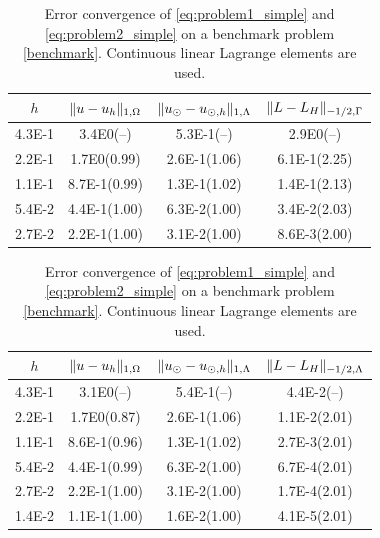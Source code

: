 \documentclass[r]{siamart171218}
\begin{document}
%
\begin{table}
  \scriptsize{
    \begin{minipage}{0.49\textwidth}
  \begin{center}
    \begin{tabular}{c|ccc}
      \hline
    $h$ & $\lVert{u-u_h}\rVert_{1, \Omega}$ & $\lVert{u_{\odot}-u_{\odot, h}}\rVert_{1, \Lambda}$ & $\lVert{L-L_H}\rVert_{-1/2,\Gamma}$\\
      \hline
4.3E-1 & 3.4E0(--) & 5.3E-1(--) & 2.9E0(--)\\
2.2E-1 & 1.7E0(0.99) & 2.6E-1(1.06) & 6.1E-1(2.25)\\
1.1E-1 & 8.7E-1(0.99) & 1.3E-1(1.02) & 1.4E-1(2.13)\\
5.4E-2 & 4.4E-1(1.00) & 6.3E-2(1.00) & 3.4E-2(2.03)\\
2.7E-2 & 2.2E-1(1.00) & 3.1E-2(1.00) & 8.6E-3(2.00)\\
\hline
  \end{tabular}
  \end{center}
  \end{minipage}
    }
    \vspace{5pt}
  \scriptsize{%
    \begin{minipage}{0.49\textwidth}
      \begin{center}
        \begin{tabular}{c|ccc}
      \hline
    $h$ & $\lVert{u-u_h}\rVert_{1, \Omega}$ & $\lVert{u_{\odot}-u_{\odot, h}}\rVert_{1, \Lambda}$ & $\lVert{L-L_H}\rVert_{-1/2, \Lambda}$\\
      \hline
4.3E-1 & 3.1E0(--)    & 5.4E-1(--)   & 4.4E-2(--)   \\
2.2E-1 & 1.7E0(0.87)  & 2.6E-1(1.06) & 1.1E-2(2.01) \\
1.1E-1 & 8.6E-1(0.96) & 1.3E-1(1.02) & 2.7E-3(2.01) \\
5.4E-2 & 4.4E-1(0.99) & 6.3E-2(1.00) & 6.7E-4(2.01) \\
2.7E-2 & 2.2E-1(1.00) & 3.1E-2(1.00) & 1.7E-4(2.01) \\
1.4E-2 & 1.1E-1(1.00) & 1.6E-2(1.00) & 4.1E-5(2.01) \\
\hline
  \end{tabular}
  \end{center}
  \end{minipage}
  }
  \caption{Error convergence of \eqref{eq:problem1_simple} and \eqref{eq:problem2_simple}
    on a benchmark problem \eqref{benchmark}. Continuous linear Lagrange
    elements are used.
  }
  \label{tab:error_conform}
\end{table}
\end{document}
